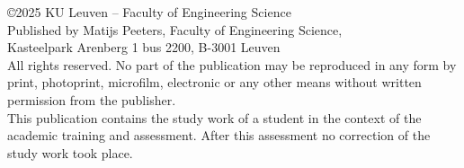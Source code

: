 \documentclass[a4paper,12pt]{report}
\begin{document}
\setcounter{page}{1}
\thispagestyle{empty}



\newpage
\thispagestyle{empty}
\vspace*{\fill}
\begin{center}
  \begin{minipage}{0.8\textwidth}
    \centering
    \justifying
    \noindent \copyright  2025 KU Leuven – Faculty of Engineering Science\\
    Published by Matijs Peeters, Faculty of Engineering Science,\\ Kasteelpark Arenberg 1 bus 2200, B-3001 Leuven\\
    All rights reserved. No part of the publication may be reproduced in any form by print, photoprint, microfilm, electronic or any other means without written permission from the publisher.\\
    This publication contains the study work of a student in the context of the academic training and assessment. After this assessment no correction of the study work took place.
  \end{minipage}
\end{center}
\vspace*{0pt}
\newpage

\tableofcontents
{}

\newpage
\listoffigures
{}
\listoftables
{}
\newpage











\end{document}
